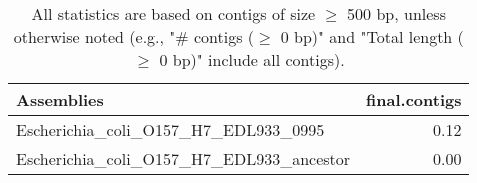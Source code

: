 \documentclass[12pt,a4paper]{article}
\begin{document}
\begin{table}[ht]
\begin{center}
\caption{All statistics are based on contigs of size $\geq$ 500 bp, unless otherwise noted (e.g., "\# contigs ($\geq$ 0 bp)" and "Total length ($\geq$ 0 bp)" include all contigs).}
\begin{tabular}{|l*{1}{|r}|}
\hline
Assemblies & final.contigs \\ \hline
Escherichia\_coli\_O157\_H7\_EDL933\_0995 & 0.12 \\ \hline
Escherichia\_coli\_O157\_H7\_EDL933\_ancestor & 0.00 \\ \hline
\end{tabular}
\end{center}
\end{table}
\end{document}
